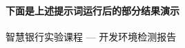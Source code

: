 \documentclass[
  american,
  chinese,
]{ctexart}
\begin{document}
\foreignlanguage{american}{\hfill\break
}

\foreignlanguage{american}{}

~

\foreignlanguage{american}{}

~

\paragraph{\texorpdfstring{{下面是上述提示{词运行}后的部分结果演示}\foreignlanguage{american}{}}{下面是上述提示词运行后的部分结果演示}}\label{ux4e0bux9762ux662fux4e0aux8ff0ux63d0ux793aux8bcdux8fd0ux884cux540eux7684ux90e8ux5206ux7ed3ux679cux6f14ux793a}

{智慧银行实验课程}{ \foreignlanguage{american}{--- }}{开发环境检测报告}\foreignlanguage{american}{}
\end{document}
